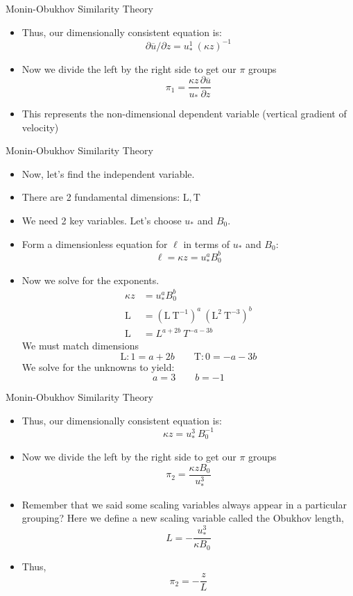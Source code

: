 \begin{frame}{Monin-Obukhov Similarity Theory}
	\begin{itemize}
		\item Thus, our dimensionally consistent equation is:
	$$ \partial \overline{u} /\partial z = u_*^1\ (\kappa z)^{-1}$$
	\item Now we divide the left by the right side to get our $\pi$ groups
	$$\pi_1 = \frac{\kappa z}{u_*} \frac{\partial \overline{u}}{\partial z}$$
	\item This represents the non-dimensional dependent variable (vertical gradient of velocity)
	\end{itemize}
\end{frame}
\begin{frame}{Monin-Obukhov Similarity Theory}
	\begin{itemize}
		\item Now, let's find the independent variable.
		\item There are 2 fundamental dimensions: $\mathrm{L, T}$
		\item We need 2 key variables. Let's choose $u_*$ and $B_0$.
	\item Form a dimensionless equation for $\ell$ in terms of $u_*$ and $B_0$: $$
		\ell = \kappa z = u_*^a B_0^b$$
	\item Now we solve for the exponents.
	\begin{align*}
	\kappa z &= u_*^a B_0^b\\
	\mathrm{L} &= (\mathrm{L\ T^{-1}})^a\ (\mathrm{L^2\ T^{-3}})^b\\
	\mathrm{L} &= L^{a+2b}\ T^{-a-3b}
	\end{align*}
	We must match dimensions
	$$\mathrm{L}: 1 = a+2b \qquad \mathrm{T}: 0 = -a-3b$$
	We solve for the unknowns to yield:
	$$a=3 \qquad b=-1$$
	\end{itemize}
\end{frame}
\begin{frame}{Monin-Obukhov Similarity Theory}
	\begin{itemize}
		\item Thus, our dimensionally consistent equation is:
	$$\kappa z = u_*^3\ B_0^{-1}$$
	\item Now we divide the left by the right side to get our $\pi$ groups
	$$\pi_2 = \frac{\kappa z B_0}{u_*^3}$$
	\item Remember that we said some scaling variables always appear in a particular grouping? Here we define a new scaling variable called the Obukhov length,
	$$L=-\frac{u_*^3}{\kappa B_0}$$
	\item Thus, 
	$$\pi_2 = -\frac{z}{L}$$
	\end{itemize}
\end{frame}
